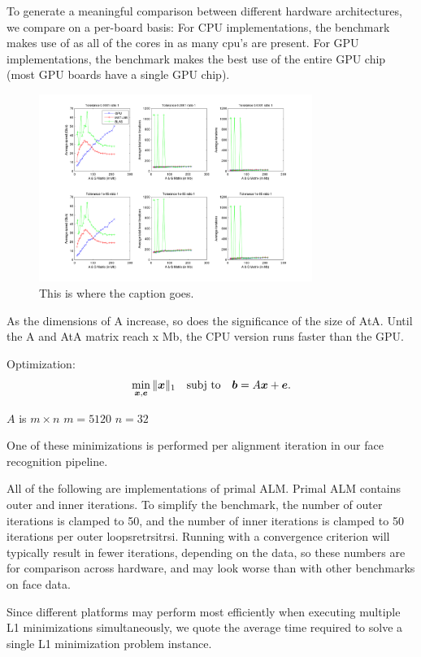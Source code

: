 \documentclass[10pt,twocolumn,letterpaper]{article}
\begin{document}
To generate a meaningful comparison between different hardware
architectures, we compare on a per-board basis:  For CPU implementations, the benchmark makes use of
as all of the cores in as many cpu's are present.  For GPU implementations, the benchmark makes the best use
of the entire GPU chip (most GPU boards have a single GPU chip).

\begin{figure}
\centering
\includegraphics[width=3.5in]{figures/PALM_benchmark_ratio_1.png}
\caption{This is where the caption goes.}
\label{fig:uniqueidentifierforthisimage}
\end{figure}

As the dimensions of A increase, so does the significance of the size of AtA.  Until the A and AtA matrix reach x Mb, the CPU version runs faster than the GPU.  

Optimization:
\begin{equation}
\min_{{\boldsymbol{x}}, \boldsymbol{e}} \|{\boldsymbol{x}}\|_1 \quad \textup{subj to} \quad \boldsymbol{b} = A {\boldsymbol{x}} + \boldsymbol{e}.
\end{equation}

$A$ is $m \times n$
$m = 5120$
$n = 32$

One of these minimizations is performed per 
alignment iteration in our face recognition pipeline.

All of the following are implementations of primal ALM.
Primal ALM contains outer and inner iterations.
To simplify the benchmark, the number of outer iterations
is clamped to 50, and the number of inner iterations is
clamped to 50 iterations per outer loopsretrsitrsi.  Running with
a convergence criterion will typically result in fewer
iterations, depending on the data, so these numbers are
for comparison across hardware, and may look worse than
with other benchmarks on face data.

Since different platforms may perform most efficiently when
executing multiple L1 minimizations simultaneously,
we quote the average time required to solve a single L1
minimization problem instance.
\end{document}
